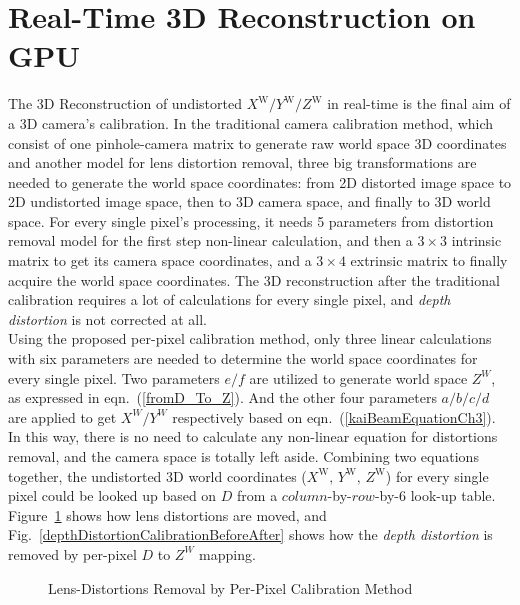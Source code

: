 \section{Real-Time 3D Reconstruction on GPU}
%
The 3D Reconstruction of undistorted \(X^\text{W}/Y^\text{W}/Z^\text{W}\) in real-time is the final aim of a 3D camera's calibration. In the traditional camera calibration method, which consist of one pinhole-camera matrix to generate raw world space 3D coordinates and another model for lens distortion removal, three big transformations are needed to generate the world space coordinates: from 2D distorted image space to 2D undistorted image space, then to 3D camera space, and finally to 3D world space. For every single pixel's processing, it needs 5 parameters from distortion removal model for the first step non-linear calculation, and then a $3\times3$ intrinsic matrix to get its camera space coordinates, and a $3\times4$ extrinsic matrix to finally acquire the world space coordinates. The 3D reconstruction after the traditional calibration requires a lot of calculations for every single pixel, and \emph{depth distortion} is not corrected at all.
\\\indent
%
Using the proposed per-pixel calibration method, only three linear calculations with six parameters are needed to determine the world space coordinates for every single pixel. Two parameters \(e/f\) are utilized to generate world space \(Z^W\), as expressed in eqn.~(\ref{fromD_To_Z}). And the other four parameters \(a/b/c/d\) are applied to get \(X^W/Y^W\) respectively based on eqn.~(\ref{kaiBeamEquationCh3}). In this way, there is no need to calculate any non-linear equation for distortions removal, and the camera space is totally left aside. Combining two equations together, the undistorted 3D world coordinates (\(X^\text{W}, \, Y^\text{W}, \, Z^\text{W}\)) for every single pixel could be looked up based on \(D\) from a \(column\)-by-\(row\)-by-\(6\) look-up table. Figure~\ref{perPixelCalibrationBeforeAfter} shows how lens distortions are moved, and Fig.~\ref{depthDistortionCalibrationBeforeAfter} shows how the \emph{depth distortion} is removed by per-pixel \(D\) to \(Z^W\) mapping.
\begin{figure}[t]
\centering
\hspace*{-0.3cm}
%
%
\caption{Lens-Distortions Removal by Per-Pixel Calibration Method}
\label{perPixelCalibrationBeforeAfter}
\end{figure}%
